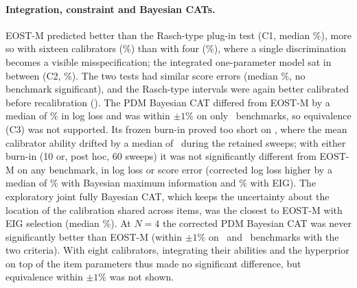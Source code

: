 \paragraph{Integration, constraint and Bayesian CATs.} EOST-M predicted better than the
Rasch-type plug-in test (C1, median \STwoCOneMed\%), more so with sixteen calibrators
(\SecCOneNSixteenMed\%) than with four (\SecCOneNFourMed\%), where a single discrimination
becomes a visible misspecification; the integrated one-parameter model sat in between (C2,
\STwoCTwoMed\%). The two tests had similar score errors (median \SecEostVsRaschIAEMed\%, no
benchmark significant), and the Rasch-type intervals were again better calibrated before
recalibration (\STwoCovmfiOnepr). The PDM Bayesian CAT differed from EOST-M by a median of
\STwoCThreeMed\% in log loss and was within $\pm1\%$ on only \STwoCThreeEq\ benchmarks, so
equivalence (C3) was not supported. Its frozen burn-in proved too short on
\FbDriftFrozenBank, where the mean calibrator ability drifted by a median of
\FbDriftFrozenMax\ during the retained sweeps; with either burn-in (10 or, post hoc, 60
sweeps) it was not significantly different from EOST-M on any benchmark, in log loss or score
error (corrected log loss higher by a median of \FbBmiMed\% with Bayesian maximum information
and \FbEigMed\% with EIG). The exploratory joint fully Bayesian CAT, which
keeps the uncertainty about the location of the calibration shared across items, was the
closest to EOST-M with EIG selection (median \FbjEigMed\%). At $N=4$ the corrected PDM
Bayesian CAT was never significantly better than EOST-M (within $\pm1\%$ on \FbBmiEqNFour\
and \FbEigEqNFour\ benchmarks with the two criteria). With eight calibrators, integrating
their abilities and the hyperprior on top of the item parameters thus made no significant
difference, but equivalence within $\pm1\%$ was not shown.

